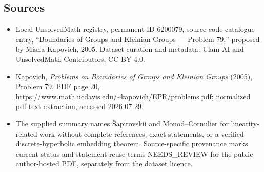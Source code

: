 \documentclass[11pt]{article}
\begin{document}
\subsection{Sources}
\begin{itemize}
\item Local UnsolvedMath registry, permanent ID 6200079, source code catalogue entry, ``Boundaries of Groups and Kleinian Groups --- Problem 79,'' proposed by Misha Kapovich, 2005. Dataset curation and metadata: Ulam AI and UnsolvedMath Contributors, CC BY 4.0.
\item Kapovich, \emph{Problems on Boundaries of Groups and Kleinian Groups} (2005), Problem 79, PDF page 20, \url{https://www.math.ucdavis.edu/~kapovich/EPR/problems.pdf}; normalized pdf-text extraction, accessed 2026-07-29.
\item The supplied summary names Šapirovskii and Monod--Cornulier for linearity-related work without complete references, exact statements, or a verified discrete-hyperbolic embedding theorem. Source-specific provenance marks current status and statement-reuse terms NEEDS\_REVIEW for the public author-hosted PDF, separately from the dataset licence.
\end{itemize}
\end{document}
